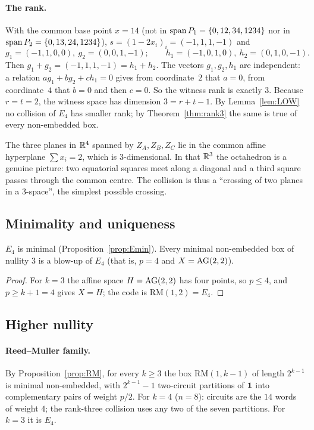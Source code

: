 \paragraph{The rank.} With the common base point $x=14$ (not in $\operatorname{span} P_1=\{0,12,34,1234\}$ nor in $\operatorname{span} P_2=\{0,13,24,1234\}$), $s=(1-2x_i)_i=(-1,1,1,-1)$ and
\[
g_1=(-1,1,0,0),\ g_2=(0,0,1,-1);\qquad h_1=(-1,0,1,0),\ h_2=(0,1,0,-1).
\]
Then $g_1+g_2=(-1,1,1,-1)=h_1+h_2$. The vectors $g_1,g_2,h_1$ are independent: a relation $ag_1+bg_2+ch_1=0$ gives from coordinate~$2$ that $a=0$, from coordinate~$4$ that $b=0$ and then $c=0$. So the witness rank is exactly $3$. Because $r=t=2$, the witness space has dimension $3=r+t-1$. By Lemma~\ref{lem:LOW} no collision of $E_4$ has smaller rank; by Theorem~\ref{thm:rank3} the same is true of every non-embedded box.

\begin{remark}
The three planes in $\mathbb R^4$ spanned by $Z_A,Z_B,Z_C$ lie in the common affine hyperplane $\sum x_i=2$, which is $3$-dimensional. In that $\mathbb R^3$ the octahedron is a genuine picture: two equatorial squares meet along a diagonal and a third square passes through the common centre. The collision is thus a ``crossing of two planes in a $3$-space'', the simplest possible crossing.
\end{remark}

\subsection{Minimality and uniqueness}

\begin{proposition}\label{prop:unique-k3}
$E_4$ is minimal (Proposition~\ref{prop:Emin}). Every minimal non-embedded box of nullity $3$ is a blow-up of $E_4$ (that is, $p=4$ and $X=\mathrm{AG}(2,2)$).
\end{proposition}

\begin{proof}
For $k=3$ the affine space $H=\mathrm{AG}(2,2)$ has four points, so $p\le4$, and $p\ge k+1=4$ gives $X=H$; the code is $\mathrm{RM}(1,2)=E_4$.
\end{proof}

\subsection{Higher nullity}

\paragraph{Reed--Muller family.} By Proposition~\ref{prop:RM}, for every $k\ge3$ the box $\mathrm{RM}(1,k-1)$ of length $2^{k-1}$ is minimal non-embedded, with $2^{k-1}-1$ two-circuit partitions of $\mathbf 1$ into complementary pairs of weight $p/2$. For $k=4$ ($n=8$): circuits are the $14$ words of weight $4$; the rank-three collision uses any two of the seven partitions. For $k=3$ it is $E_4$.


